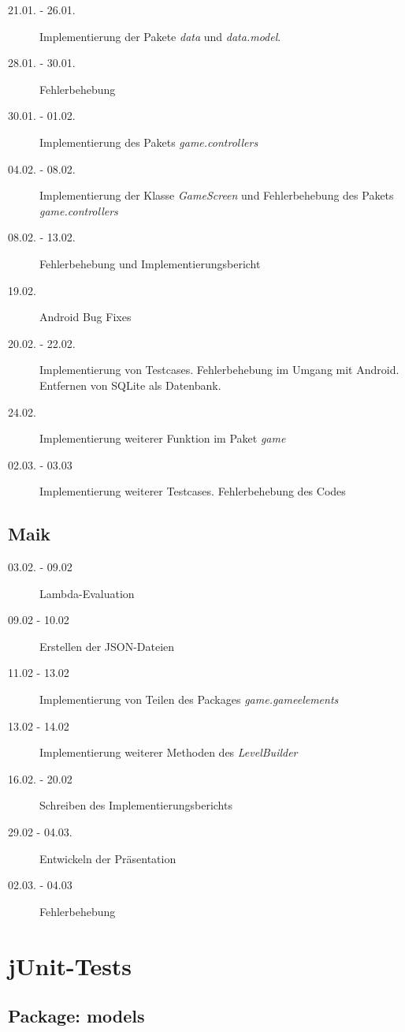 \documentclass[parskip=full]{scrreprt}
\begin{document}
\begin{description}
\item[21.01. - 26.01.]
Implementierung der Pakete \emph{data} und \emph{data.model}.
\item[28.01. - 30.01.]
Fehlerbehebung
\item[30.01. - 01.02.]
Implementierung des Pakets \emph{game.controllers}
\item[04.02. - 08.02.]
Implementierung der Klasse \emph{GameScreen} und Fehlerbehebung des Pakets \emph{game.controllers}
\item[08.02. - 13.02.]
Fehlerbehebung und Implementierungsbericht
\item[19.02.]
Android Bug Fixes
\item[20.02. - 22.02.]
Implementierung von Testcases. Fehlerbehebung im Umgang mit Android. Entfernen von SQLite als Datenbank.
\item[24.02.]
Implementierung weiterer Funktion im Paket \emph{game}
\item[02.03. - 03.03]
Implementierung weiterer Testcases. Fehlerbehebung des Codes
\end{description}

\section{Maik}
\begin{description}
\item[03.02. - 09.02] Lambda-Evaluation
\item[09.02 - 10.02] Erstellen der JSON-Dateien
\item[11.02 - 13.02] Implementierung von Teilen des Packages \emph{game.gameelements}
\item[13.02 - 14.02] Implementierung weiterer Methoden des \emph{LevelBuilder}
\item[16.02. - 20.02] Schreiben des Implementierungsberichts
\item[29.02 - 04.03.] Entwickeln der Präsentation
\item[02.03. - 04.03] Fehlerbehebung 
\end{description}

\chapter{jUnit-Tests}

\section{Package: models}
\end{document}
